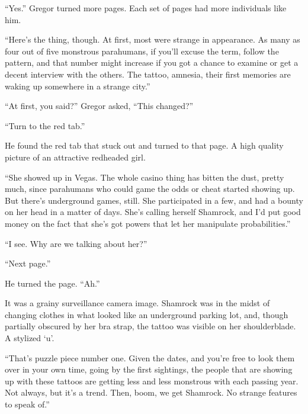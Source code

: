 ``Yes.''  Gregor turned more pages.  Each set of pages had more individuals like him.



``Here's the thing, though.  At first, most were strange in appearance.  As many as four out of five monstrous parahumans, if you'll excuse the term, follow the pattern, and that number might increase if you got a chance to examine or get a decent interview with the others.  The tattoo, amnesia, their first memories are waking up somewhere in a strange city.''



``At first, you said?'' Gregor asked, ``This changed?''



``Turn to the red tab.''



He found the red tab that stuck out and turned to that page.  A high quality picture of an attractive redheaded girl.



``She showed up in Vegas.  The whole casino thing has bitten the dust, pretty much, since parahumans who could game the odds or cheat started showing up.  But there's underground games, still.  She participated in a few, and had a bounty on her head in a matter of days.  She's calling herself Shamrock, and I'd put good money on the fact that she's got powers that let her manipulate probabilities.''



``I see.  Why are we talking about her?''



``Next page.''



He turned the page.  ``Ah.''



It was a grainy surveillance camera image.  Shamrock was in the midst of changing clothes in what looked like an underground parking lot, and, though partially obscured by her bra strap, the tattoo was visible on her shoulderblade.  A stylized `u'.



``That's puzzle piece number one.  Given the dates, and you're free to look them over in your own time, going by the first sightings, the people that are showing up with these tattoos are getting less and less monstrous with each passing year.  Not always, but it's a trend.  Then, boom, we get Shamrock.  No strange features to speak of.''




